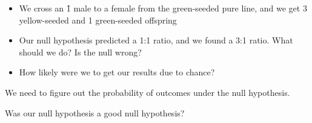 
\begin{frame}
    \begin{itemize}
        \item<1-> We cross an \f{1} male to a female from the green-seeded pure
            line, and we get 3 yellow-seeded and 1 green-seeded offspring

            \vspace{0.5cm}
        \item<2-> Our null hypothesis predicted a 1:1 ratio, and we found a 3:1
            ratio.  What should we do? Is the null wrong?

            \vspace{0.5cm}
        \item<3-> How likely were we to get our results due to chance?
    \end{itemize}
\end{frame}

\begin{frame}
    We need to figure out the probability of outcomes under the null
    hypothesis.

    \vspace{1cm}
    Was our null hypothesis a good null hypothesis?
\end{frame}

